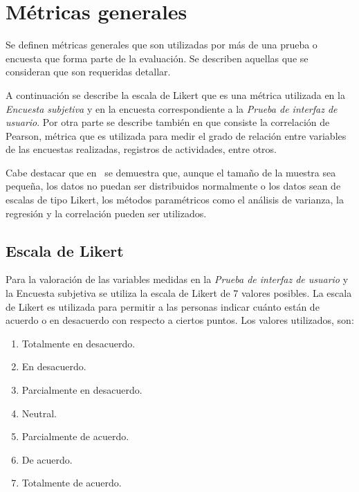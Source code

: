 
\section{Métricas generales}

Se definen métricas generales  que son utilizadas por más de una prueba o
encuesta que forma parte de la evaluación. Se describen aquellas que se
consideran que son requeridas detallar.

A continuación se describe la escala de Likert que es una métrica utilizada en
la \emph{Encuesta subjetiva} y en la encuesta correspondiente a la \emph{Prueba
de interfaz de usuario}. Por otra parte se describe también en que consiste la
correlación de Pearson, métrica que es utilizada para medir el grado de relación
entre variables de las encuestas realizadas, registros de actividades, entre
otros.

Cabe destacar que en~\cite{norman2010likert} se demuestra que, aunque el tamaño
de la muestra sea pequeña, los datos no puedan ser distribuidos normalmente o
los datos sean de escalas de tipo Likert, los métodos paramétricos como el
análisis de varianza, la regresión y la correlación pueden ser utilizados.


\subsection{Escala de Likert}
\label{sec:likert}

Para la valoración de las variables medidas en la \emph{Prueba de interfaz de
    usuario} y la {Encuesta subjetiva} se utiliza la escala de
Likert\cite{Allen:2007} de 7 valores posibles. La escala de Likert es utilizada
para permitir a las personas indicar cuánto están de acuerdo o en desacuerdo con
respecto a ciertos puntos. Los valores utilizados, son:

\begin{enumerate}
    \item Totalmente en desacuerdo.
    \item En desacuerdo.
    \item Parcialmente en desacuerdo.
    \item Neutral.
    \item Parcialmente de acuerdo.
    \item De acuerdo.
    \item Totalmente de acuerdo.
\end{enumerate}

